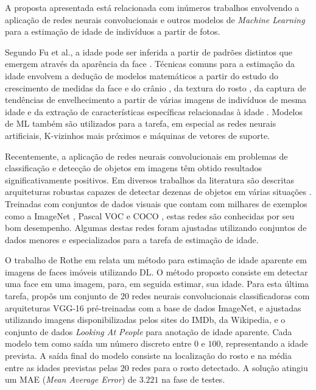 A proposta apresentada está relacionada com inúmeros trabalhos envolvendo a aplicação de redes neurais convolucionais e outros modelos de \emph{Machine Learning} para a estimação de idade de indivíduos a partir de fotos.

Segundo Fu et al., a idade pode ser inferida a partir de padrões distintos que emergem através da aparência da face \cite{fu2010age}. Técnicas comuns para a estimação da idade envolvem a dedução de modelos matemáticos a partir do estudo do crescimento de medidas da face e do crânio \cite{kwon1999age}, da textura do rosto \cite{lanitis2002toward}, da captura de tendências de envelhecimento a partir de várias imagens de indivíduos de mesma idade \cite{fu2007estimating} e da extração de características específicas relacionadas à idade \cite{suo2008design, lou2018expression}. Modelos de ML também são utilizados para a tarefa, em especial as redes neurais artificiais, K-vizinhos mais próximos e máquinas de vetores de suporte.

Recentemente, a aplicação de redes neurais convolucionais em problemas de classificação e detecção de objetos em imagens têm obtido resultados significativamente positivos. Em  diversos trabalhos da literatura são descritas arquiteturas robustas capazes de detectar dezenas de objetos em várias situações \cite{vggnet, resnet, inception, redmon2016you, ssd}. Treinadas com conjuntos de dados visuais que contam com milhares de exemplos como a ImageNet \cite{ImagenetChall}, Pascal VOC \cite{pascalvoc} e COCO \cite{coco}, estas redes são conhecidas por seu bom desempenho. Algumas destas redes foram ajustadas utilizando conjuntos de dados menores e especializados para a tarefa de estimação de idade.

O trabalho de Rothe em \cite{rothe2015dex} relata um método para estimação de idade aparente em imagens de faces imóveis utilizando DL. O método proposto consiste em detectar uma face em uma imagem, para, em seguida estimar, sua idade. Para esta última tarefa, propôs um conjunto de $20$ redes neurais convolucionais classificadoras com arquiteturas VGG-16 pré-treinadas com a base de dados ImageNet, e ajustadas utilizando imagens disponibilizadas pelos sites do IMDb, da Wikipedia, e o conjunto de dados \emph{Looking At People} para anotação de idade aparente. Cada modelo tem como saída um número discreto entre $0$ e $100$, representando a idade prevista. A saída final do modelo consiste na localização do rosto e na média entre as idades previstas pelas $20$ redes para o rosto detectado. A solução atingiu um MAE (\emph{Mean Average Error}) de $3.221$ na fase de testes.


